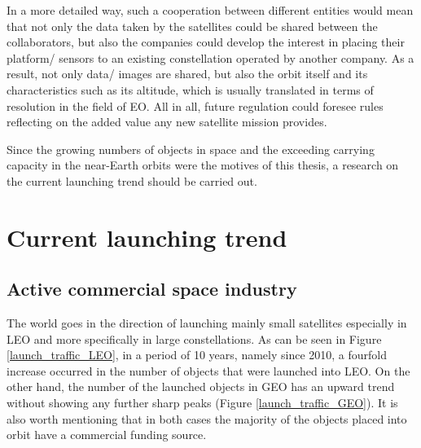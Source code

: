 In a more detailed way, such a cooperation between different entities would mean that not only the data taken by the satellites could be shared between the collaborators, but also the companies could develop the interest in placing their platform/ sensors to an existing constellation operated by another company. As a result, not only data/ images are shared, but also the orbit itself and its characteristics such as its altitude, which is usually translated in terms of resolution in the field of EO. All in all, future regulation could foresee rules reflecting on the added value any new satellite mission provides.




\bigskip
Since the growing numbers of objects in space and the exceeding carrying capacity in the near-Earth orbits were the motives of this thesis, a research on the current launching trend should be carried out.


\bigskip
\section{Current launching trend}
\bigskip

\subsection{Active commercial space industry}
\bigskip

The world goes in the direction of launching mainly small satellites especially in LEO and more specifically in large constellations. As can be seen in Figure \ref{launch_traffic_LEO}, in a period of 10 years, namely since 2010, a fourfold increase occurred in the number of objects that were launched into LEO. On the other hand, the number of the launched objects in GEO has an upward trend without showing any further sharp peaks (Figure \ref{launch_traffic_GEO}). It is also worth mentioning that in both cases the majority of the objects placed into orbit have a commercial funding source.

